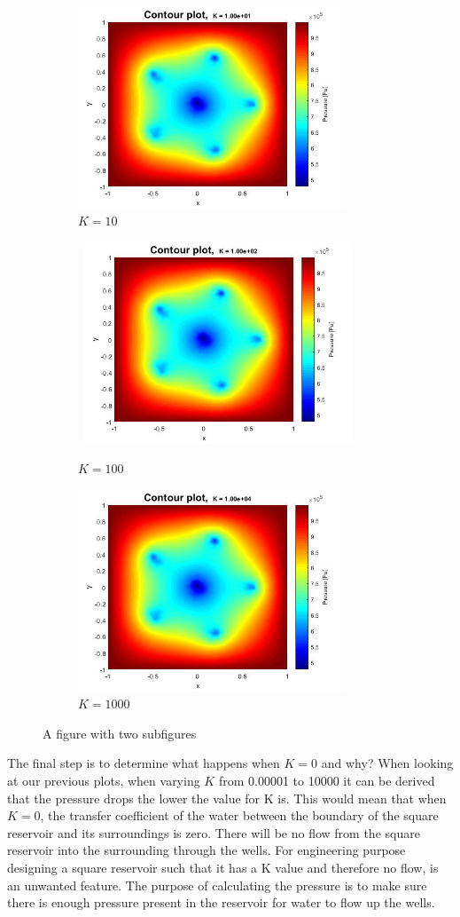 \documentclass[a4paper]{report}
\begin{document}
\begin{figure}
\begin{subfigure}{.45\textwidth}
	\centering
	\includegraphics[width=8cm]{2Dvheatk10.jpg}
	\caption{$K=10$}
	\label{fig:sub4}
\end{subfigure}
	\begin{subfigure}{.45\textwidth}
	\centering\
	\includegraphics[width=8cm]{2Dheatk100.jpg}
	\caption{$K=100$}
	\label{fig:sub3}
\end{subfigure}%
\begin{subfigure}{.45\textwidth}
	\centering
	\includegraphics[width=8cm]{2Dheatk10000.jpg}
	\caption{$K=1000$}
	\label{fig:sub4}
\end{subfigure}
	\caption{A figure with two subfigures}
	\label{fig:test}
\end{figure}




The final step is to determine what happens when $K=0$ and why? When looking at our previous plots, when varying $K$ from 0.00001 to 10000 it can be derived that the pressure drops the lower the value for K is. This would mean that when $K=0$, the transfer coefficient of the water between the boundary of the square reservoir and its surroundings is zero. There will be no flow from the square reservoir into the surrounding through the wells. For engineering purpose designing a square reservoir such that it has a K value and therefore no flow, is an unwanted feature. The purpose of calculating the pressure is to make sure there is enough pressure present in the reservoir for water to flow up the wells.
\end{document}

